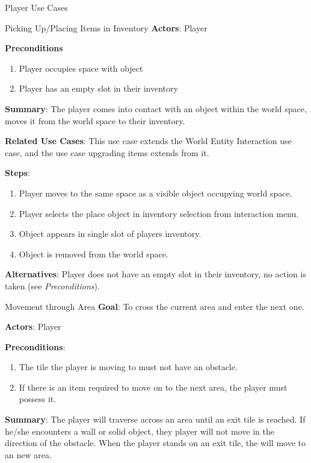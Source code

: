 \documentclass[12pt]{report}
\begin{document}
\begin{section}{Player Use Cases}
\begin{subsection}{Picking Up/Placing Items in Inventory}
      \textbf{Actors}:
      Player

      \textbf{Preconditions}
      \begin{enumerate}
        \item Player occupies space with object
        \item Player has an empty slot in their inventory
      \end{enumerate}

      \textbf{Summary}:
      The player comes into contact with an object within the world 
      space, moves it from the world space to their inventory.

      \textbf{Related Use Cases}:
      This use case extends the World Entity Interaction use case, and the
      use case upgrading items extends from it.

      \textbf{Steps}:
      \begin{enumerate}
        \item Player moves to the same space as a visible object occupying world
	      space.
        \item Player selects the place object in inventory selection from 
	      interaction menu.
        \item Object appears in single slot of players inventory.
        \item Object is removed from the world space.
      \end{enumerate}

      \textbf{Alternatives}:
      Player does not have an empty slot in their inventory, no action is
      taken (see \textit{Preconditions}).
    \end{subsection}


    \begin{subsection}{Movement through Area}
      \textbf{Goal}:
      To cross the current area and enter the next one.
      
      \textbf{Actors}:
      Player

      \textbf{Preconditions}:
      \begin{enumerate}
        \item The tile the player is moving to must not have an obstacle. 
        \item If there is an item required to move on to the next area, the player must possess it.
      \end{enumerate}

      \textbf{Summary}:
      The player will traverse across an area until an exit tile is reached. If he/she encounters a wall or solid object, they player will not move in the direction of the obstacle. When the player stands on an exit tile, the will move to an new area.


\end{subsection}
\end{section}
\end{document}
